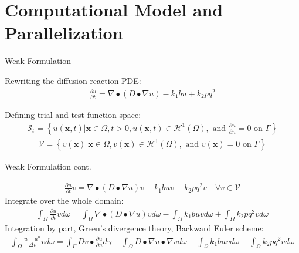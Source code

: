 \documentclass[11pt,t]{beamer}
\begin{document}
\section{Computational Model and Parallelization}

\begin{frame}[fragile]{Weak Formulation}

Rewriting the diffusion-reaction PDE:
\begin{gather*}
\frac{\partial u}{\partial t}=\nabla \bullet (D \bullet  \nabla u)-k_{1} b u+k_{2} p q^{2}
\end{gather*}

Defining trial and test function space:
\begin{gather*}
\mathcal{S}_{t}=\left\{u(\mathbf{x}, t) | \mathbf{x} \in \Omega, t>0, u(\mathbf{x}, t) \in \mathcal{H}^{1}(\Omega), \text { and } \frac{\partial u}{\partial n}=0 \text { on } \Gamma\right\}
\end{gather*}
\begin{gather*}
\mathcal{V}=\left\{v(\mathbf{x}) | \mathbf{x} \in {\Omega}, v(\mathbf{x}) \in \mathcal{H}^{1}(\Omega), \text { and } v(\mathbf{x})=0 \text { on } \Gamma\right\}
\end{gather*}


\end{frame}


\begin{frame}[fragile]{Weak Formulation cont.}

\begin{gather*}
\frac{\partial u}{\partial t} v=\nabla \bullet (D \bullet \nabla u) v-k_{1} b u v+k_{2} p q^{2} v \quad \forall v \in \mathcal{V}
\end{gather*}
Integrate over the whole domain:
\begin{gather*}
\int_{\Omega} \frac{\partial u}{\partial t} v d \omega=\int_{\Omega} \nabla \bullet (D \bullet \nabla u) v d \omega-\int_{\Omega} k_{1} b u v d \omega+\int_{\Omega} k_{2} p q^{2} v d \omega
\end{gather*}
Integration by part, Green's divergence theory, Backward Euler scheme:
\begin{gather*}
\int_{\Omega} \frac{u-u^{n}}{\Delta t} v d \omega=\int_{\Gamma} D v \bullet \frac{\partial u}{\partial n} d \gamma-\int_{\Omega} D \bullet \nabla u \bullet \nabla v d \omega-\int_{\Omega} k_{1} b u v d \omega+\int_{\Omega} k_{2} p q^{2} v d \omega
\end{gather*}

\end{frame}
\end{document}
